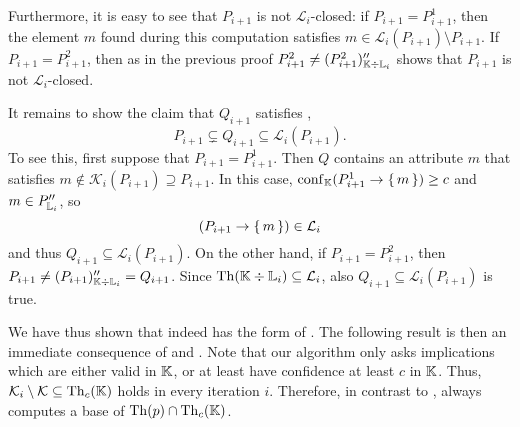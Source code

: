 Furthermore, it is easy to see that $P_{i+1}$ is not $\mathcal{L}_{i}$-closed: if $P_{i+1}
= P_{i+1}^{1}$, then the element $m$ found during this computation satisfies $m \in
\mathcal{L}_{i}(P_{i+1}) \setminus P_{i+1}$.  If $P_{i+1} = P_{i+1}^{2}$, then as in the
previous proof $P_{i+1}^{2} \neq (P_{i+1}^{2})_{{\mathbb{K}} \div {\ensuremath{\mathbb{L}}}_{i}}''$ shows that
$P_{i+1}$ is not $\mathcal{L}_{i}$-closed.

It remains to show the claim that $Q_{i+1}$ satisfies , \ie
\begin{equation*}
  P_{i+1} \subsetneq Q_{i+1} \subseteq \mathcal{L}_{i}(P_{i+1}).
\end{equation*}
To see this, first suppose that $P_{i+1} = P_{i+1}^{1}$.  Then $Q$ contains an attribute
$m$ that satisfies $m \notin \mathcal{K}_{i}(P_{i+1}) \supseteq P_{i+1}$.  In this case,
$\operatorname{conf}_{{\mathbb{K}}}(P_{i+1}^{1} \to {\ensuremath{\{\,m\,\}}}) \ge c$ and $m \in P_{{\mathbb{L}}_{i}}''$, so
\begin{equation*}
  (P_{i+1} \to {\ensuremath{\{\,m\,\}}}) \in \mathcal{L}_{i}
\end{equation*}
and thus $Q_{i+1} \subseteq \mathcal{L}_{i}(P_{i+1})$.  On the other hand, if $P_{i+1} =
P_{i+1}^{2}$, then $P_{i+1} \neq (P_{i+1})_{{\mathbb{K}} \div {\ensuremath{\mathbb{L}}}_{i}}'' = Q_{i+1}$.  Since
$\operatorname{Th}({\mathbb{K}} \div {\ensuremath{\mathbb{L}}}_{i}) \subseteq \mathcal{L}_{i}$, also $Q_{i+1} \subseteq
\mathcal{L}_{i}(P_{i+1})$ is true.

We have thus shown that 
indeed has the form of .  The following
result is then an immediate consequence of
 and
.  Note that our
algorithm only asks implications which are either valid in ${\mathbb{K}}$, or at least have
confidence at least $c$ in ${\mathbb{K}}$.  Thus, $\mathcal{K}_{i} \setminus \mathcal{K}
\subseteq \operatorname{Th}_{c}({\mathbb{K}})$ holds in every iteration $i$.  Therefore, in contrast to
,
 always computes a base of
$\operatorname{Th}(p) \cap \operatorname{Th}_{c}({\mathbb{K}})$.

